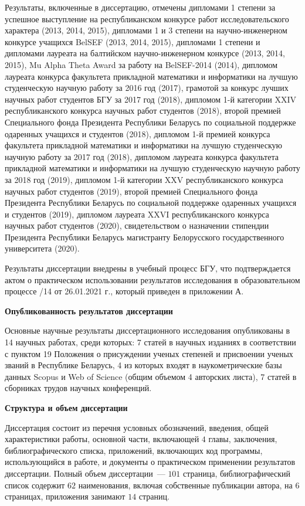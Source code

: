 \documentclass[_00_autoref.tex]{subfiles}
\begin{document}
Результаты, включенные в диссертацию, отмечены
дипломами 1 степени за успешное выступление на республиканском конкурсе работ исследовательского характера (2013, 2014, 2015),
дипломами 1 и 3 степени на научно-инженерном конкурсе учащихся BelSEF (2013, 2014, 2015),
дипломами 1 степени и дипломами лауреата на балтийском научно-инженерном конкурсе (2013, 2014, 2015),
Mu Alpha Theta Award за работу на BelSEF-2014 (2014),
дипломом лауреата конкурса факультета прикладной математики и информатики на лучшую студенческую научную работу за 2016 год (2017),
грамотой за конкурс лучших научных работ студентов БГУ за 2017 год (2018),
дипломом 1-й категории XXIV республиканского конкурса научных работ студентов (2018),
второй премией Специального фонда Президента Республики Беларусь по социальной поддержке одаренных учащихся и студентов (2018),
дипломом 1-й премией конкурса факультета прикладной математики и информатики на лучшую студенческую научную работу за 2017 год (2018),
дипломом лауреата конкурса факультета прикладной математики и информатики на лучшую студенческую научную работу за 2018 год (2019),
дипломом 1-й категории XXV республиканского конкурса научных работ студентов (2019),
второй премией Специального фонда Президента Республики Беларусь по социальной поддержке одаренных учащихся и студентов (2019),
дипломом лауреата XXVI республиканского конкурса научных работ студентов (2020),
свидетельством о назначении стипендии Президента Республики Беларусь магистранту Белорусского государственного университета (2020).

Результаты диссертации внедрены в учебный процесс БГУ, что подтверждается актом о практическом использовании результатов исследования в образовательном процессе /14 от 26.01.2021 г., который приведен в приложении А.

\medskip
\centerline{\textbf{Опубликованность результатов диссертации}}

Основные научные результаты диссертационного исследования опубликованы в 14 научных работах, среди которых: 7 статей в научных изданиях в соответствии с пунктом 19 Положения о присуждении ученых степеней и присвоении ученых званий в Республике Беларусь, 4 из которых входят в наукометрические базы данных Scopus и Web of Science (общим объемом 4 авторских листа), 7 статей в сборниках трудов научных конференций.

\medskip
\centerline{\textbf{Структура и объем диссертации}}

Диссертация состоит из перечня условных обозначений, введения, общей характеристики работы, основной части, включающей $4$ главы, заключения, библиографического списка, приложений, включающих код программы, использующийся в работе, и документы о практическом применении результатов диссертации.
Полный объем диссертации~--- $101$ страница, библиографический список содержит $62$ наименования, включая собственные публикации автора, на $6$ страницах, приложения занимают $14$ страниц.
\end{document}
